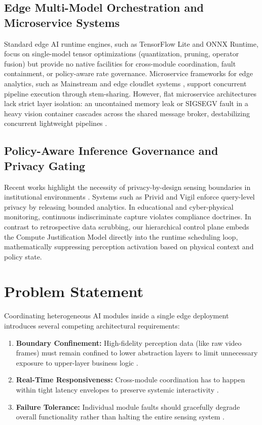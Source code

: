 \documentclass[conference]{IEEEtran}
\begin{document}
\subsection{Edge Multi-Model Orchestration and Microservice Systems}
Standard edge AI runtime engines, such as TensorFlow Lite \cite{b10, b31} and ONNX Runtime, focus on single-model tensor optimizations (quantization, pruning, operator fusion) but provide no native facilities for cross-module coordination, fault containment, or policy-aware rate governance. Microservice frameworks for edge analytics, such as Mainstream \cite{b21} and edge cloudlet systems \cite{b6, b23}, support concurrent pipeline execution through stem-sharing. However, flat microservice architectures lack strict layer isolation: an uncontained memory leak or SIGSEGV fault in a heavy vision container cascades across the shared message broker, destabilizing concurrent lightweight pipelines \cite{b24, b18}.

\subsection{Policy-Aware Inference Governance and Privacy Gating}
Recent works highlight the necessity of privacy-by-design sensing boundaries in institutional environments \cite{b4, b27}. Systems such as Privid \cite{b27} and Vigil \cite{b37} enforce query-level privacy by releasing bounded analytics. In educational and cyber-physical monitoring, continuous indiscriminate capture violates compliance doctrines. In contrast to retrospective data scrubbing, our hierarchical control plane embeds the Compute Justification Model directly into the runtime scheduling loop, mathematically suppressing perception activation based on physical context and policy state.

\section{Problem Statement}

Coordinating heterogeneous AI modules inside a single edge deployment introduces several competing architectural requirements:
\begin{enumerate}
    \item \textbf{Boundary Confinement:} High-fidelity perception data (like raw video frames) must remain confined to lower abstraction layers to limit unnecessary exposure to upper-layer business logic \cite{b27}.
    \item \textbf{Real-Time Responsiveness:} Cross-module coordination has to happen within tight latency envelopes to preserve systemic interactivity \cite{b21}.
    \item \textbf{Failure Tolerance:} Individual module faults should gracefully degrade overall functionality rather than halting the entire sensing system \cite{b24}.
\end{enumerate}
\end{document}
